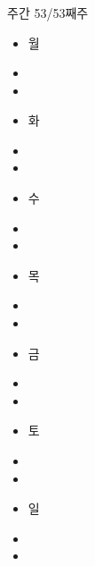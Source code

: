 \documentclass[aspectratio=1610,20pt,xcolor=pdftex,dvipsnames,table,handout]{beamer}
\begin{document}
		\begin{frame} [t,plain]
		\frametitle{}
			\begin{block} {주간 53/53째주 } %
			\setlength{\leftmargini}{1em}			
			\begin{itemize}
				\item 월	\hrulefill
				\item \hrulefill
				\item \hrulefill
				\item 화 \hrulefill
				\item \hrulefill
				\item \hrulefill
				\item 수 \hrulefill
				\item \hrulefill
				\item \hrulefill
				\item 목 \hrulefill
				\item \hrulefill
				\item \hrulefill
				\item 금 \hrulefill
				\item \hrulefill
				\item \hrulefill
				\item 토 \hrulefill
				\item \hrulefill
				\item \hrulefill
				\item 일 \hrulefill
				\item \hrulefill
				\item \hrulefill
			\end{itemize}
			\end{block}			
								
		\end{frame}						
		
\end{document}
